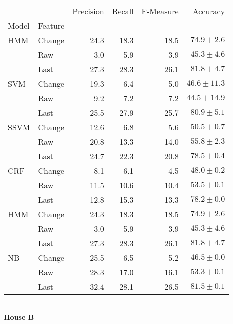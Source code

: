 \documentclass{article}
\begin{document}
\vspace{1cm}\\
\begin{tabular}{llrrrr}
\toprule
    &        &  Precision &  Recall &  F-Measure &       Accuracy \\
Model & Feature &            &         &            &                \\
\midrule
HMM & Change &       24.3 &    18.3 &       18.5 &   $74.9\pm2.6$ \\
    & Raw &        3.0 &     5.9 &        3.9 &   $45.3\pm4.6$ \\
    & Last &       27.3 &    28.3 &       26.1 &   $81.8\pm4.7$ \\
SVM & Change &       19.3 &     6.4 &        5.0 &  $46.6\pm11.3$ \\
    & Raw &        9.2 &     7.2 &        7.2 &  $44.5\pm14.9$ \\
    & Last &       25.5 &    27.9 &       25.7 &   $80.9\pm5.1$ \\
SSVM & Change &       12.6 &     6.8 &        5.6 &   $50.5\pm0.7$ \\
    & Raw &       20.8 &    13.3 &       14.0 &   $55.8\pm2.3$ \\
    & Last &       24.7 &    22.3 &       20.8 &   $78.5\pm0.4$ \\
CRF & Change &        8.1 &     6.1 &        4.5 &   $48.0\pm0.2$ \\
    & Raw &       11.5 &    10.6 &       10.4 &   $53.5\pm0.1$ \\
    & Last &       12.8 &    15.3 &       13.3 &   $78.2\pm0.0$ \\
HMM & Change &       24.3 &    18.3 &       18.5 &   $74.9\pm2.6$ \\
    & Raw &        3.0 &     5.9 &        3.9 &   $45.3\pm4.6$ \\
    & Last &       27.3 &    28.3 &       26.1 &   $81.8\pm4.7$ \\
NB & Change &       25.5 &     6.5 &        5.2 &   $46.5\pm0.0$ \\
    & Raw &       28.3 &    17.0 &       16.1 &   $53.3\pm0.1$ \\
    & Last &       32.4 &    28.1 &       26.5 &   $81.5\pm0.1$ \\
\bottomrule
\end{tabular}
\vspace{1cm}\\
\textbf{House B}\\
\vspace{1cm}\\
\end{document}
